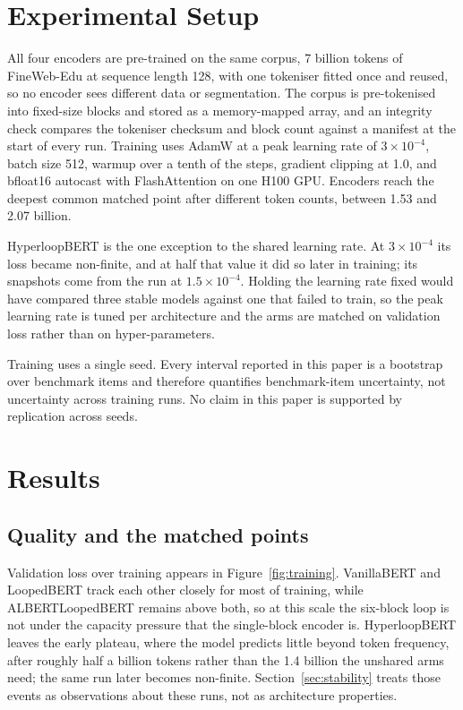 \documentclass[sigconf,natbib=true,anonymous=true]{acmart}
\begin{document}
\section{Experimental Setup}
\label{sec:setup}

All four encoders are pre-trained on the same corpus, 7 billion tokens of
FineWeb-Edu \citep{penedo2024fineweb} at sequence length 128, with one tokeniser
fitted once and reused, so no encoder sees different data or segmentation. The
corpus is pre-tokenised into fixed-size blocks and stored as a memory-mapped
array, and an integrity check compares the tokeniser checksum and block count
against a manifest at the start of every run. Training uses AdamW at a peak
learning rate of $3 \times 10^{-4}$, batch size 512, warmup over a tenth of the
steps, gradient clipping at 1.0, and bfloat16 autocast with FlashAttention
\citep{dao2022flashattention} on one H100 GPU. Encoders reach the deepest common
matched point after different token counts, between 1.53 and 2.07 billion.

HyperloopBERT is the one exception to the shared learning rate. At
$3 \times 10^{-4}$ its loss became non-finite, and at half that value it did so
later in training; its snapshots come from the run at $1.5 \times 10^{-4}$.
Holding the learning rate fixed would have compared three stable models against
one that failed to train, so the peak learning rate is tuned per architecture and
the arms are matched on validation loss rather than on hyper-parameters.

Training uses a single seed. Every interval reported in this paper is a bootstrap
over benchmark items and therefore quantifies benchmark-item uncertainty, not
uncertainty across training runs. No claim in this paper is supported by
replication across seeds.

\section{Results}
\label{sec:results}

\subsection{Quality and the matched points}

Validation loss over training appears in Figure~\ref{fig:training}.
VanillaBERT and LoopedBERT track each other closely for most of training,
while ALBERTLoopedBERT remains above both, so at this scale the six-block loop is
not under the capacity pressure that the single-block encoder is. HyperloopBERT
leaves the early plateau, where the model predicts little beyond token frequency,
after roughly half a billion tokens rather than the 1.4 billion the unshared arms
need; the same run later becomes non-finite. Section~\ref{sec:stability} treats
those events as observations about these runs, not as architecture properties.
\end{document}
